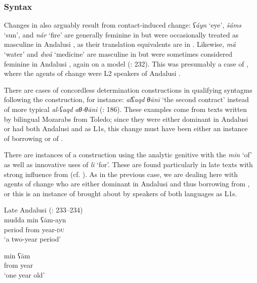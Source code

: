 \documentclass[output=paper,modfonts,nonflat]{langsci/langscibook}
\begin{document}
\subsubsection{Syntax}

Changes in   also arguably result from contact-induced change: \textit{ʕáyn} ‘eye’, \textit{šáms} ‘sun’, and \textit{nár} ‘fire’ are generally feminine in  but were occasionally treated as masculine in Andalusi , as their translation equivalents are in . Likewise, \textit{má} ‘water’ and \textit{dwá} ‘medicine’ are masculine in  but were sometimes considered feminine in Andalusi , again on a  model (\citealt{CorrientePereiraVicente2015}: 232). This was presumably a case of , where the agents of change were L2 speakers of Andalusi . 

There are cases of concordless determination constructions in qualifying syntagms following the  construction, for instance: \textit{alʕaqd} \textit{θānī} ‘the second contract’ instead of more typical \textit{al-ʕaqd} \textit{aθ-θānī} (\citealt{CorrientePereiraVicente2015}: 186). These examples come from texts written by bilingual Mozarabs from Toledo; since they were either dominant in Andalusi  or had both Andalusi  and  as L1s, this change must have been either an instance of borrowing or of . 

There are instances of a construction using the analytic genitive with the  \textit{min} ‘of’ as well as innovative uses of \textit{li} ‘for’. These are found particularly in late texts with strong influence from  (cf. \citealt{Corriente2012}). As in the previous case, we are dealing here with agents of change who are either dominant in Andalusi  and thus borrowing from , or this is an instance of  brought about by speakers of both languages as L1s.


\ea\label{bkm:Ref13069050}
{Late} Andalusi  (\citealt{CorrientePereiraVicente2015}: 233–234)\\
\ea \gll mudda min ʕām-ayn\\
     period from year-\textsc{du}\\
\glt ‘a two-year period’



\ex
\gll min ʕām\\
     from year\\
\glt ‘one year old’
\end{document}
